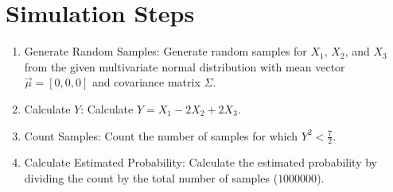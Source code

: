\documentclass[journal,12pt,twocolumn]{IEEEtran}
\begin{document}
\section{Simulation Steps}
\begin{enumerate}
    \item Generate Random Samples: Generate random samples for $X_1$, $X_2$, and $X_3$ from the given multivariate normal distribution with mean vector $\vec{\mu} = [0, 0, 0]$ and covariance matrix $\Sigma$.
    \item Calculate $Y$: Calculate $Y = X_1 - 2X_2 + 2X_3$.
    \item Count Samples: Count the number of samples for which $Y^2 < \frac{7}{2}$.
    \item Calculate Estimated Probability: Calculate the estimated probability by dividing the count by the total number of samples ($1000000$).
\end{enumerate}
\end{document}
